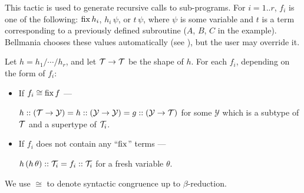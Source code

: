 This tactic is used to generate recursive calls to sub-programs. For $i=1..r$, $f_i$
is one of the following: $\operatorname{fix} h_i$, $h_i\,\psi$, or $t\,\psi$, where $\psi$ is some
variable and $t$ is a term corresponding to a previously defined subroutine
($A$, $B$, $C$ in the example).
Bellmania chooses these values automatically (see ),
but the user may override it.

\newcommand\Y{\mathcal{Y}}

\Obligations Let $h=h_1/\cdots/h_r$, and let $\mathcal{T}\to\mathcal{T}$ be the shape of $h$. 
  For each $f_i$, depending on the form of $f_i$:
\begin{itemize}
  \item If $f_i \cong \operatorname{fix} f$ --- \\
    \rule{0pt}{12pt}
    $h :: (\T \to \Y) = h :: (\Y \to \Y) = g :: (\Y \to \T)$
    for some $\Y$ which is a subtype of $\mathcal{T}$ and a supertype of $\mathcal{T}_i$.
  \item If $f_i$ does not contain any ``$\operatorname{fix}$'' terms ---\\
    \rule{0pt}{12pt}
    $h\,(h\,\theta) :: \mathcal{T}_i = f_i :: \mathcal{T}_i$ for a fresh variable $\theta$.
\end{itemize}

We use $\cong$ to denote syntactic congruence up to $\beta$-reduction.


\newenvironment{tacticbox}[1]{\begin{center}
  \begin{tabular}{|@{~~~~}l@{~~~~}|}\hline
    \rule{0pt}{2.3ex}\underline{\sf \,#1\,}\\[.4em]$}
  {$\\[-1em] \\[.3ex] \hline \end{tabular} \end{center}}

\newcommand\vtyped[2]{\underset{\scriptscriptstyle ( #2 )}{ #1 }}


\makeatletter
\newcommand{\quadrants@normal}[4]{
  \renewcommand\arraystretch{1.5}
   \begin{array}{c|c}
     #1 & #2 \\ \hline
     #3 & #4
   \end{array}}
\newcommand{\quadrants@small}[4]{
  \renewcommand\arraystretch{0.9}
   \begin{array}{@{~}c@{~}|@{~}c@{~}}
     \scriptstyle #1 & \scriptstyle #2 \\ \hline
     \scriptstyle #3 & \scriptstyle #4
   \end{array}}
\newcommand\quadrants{\@ifstar\quadrants@small\quadrants@normal}
\makeatother

